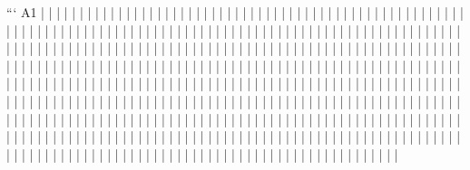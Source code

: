 ```
  A1
   |
   |
   |
   |
   |
   |
   |
   |
   |
   |
   |
   |
   |
   |
   |
   |
   |
   |
   |
   |
   |
   |
   |
   |
   |
   |
   |
   |
   |
   |
   |
   |
   |
   |
   |
   |
   |
   |
   |
   |
   |
   |
   |
   |
   |
   |
   |
   |
   |
   |
   |
   |
   |
   |
   |
   |
   |
   |
   |
   |
   |
   |
   |
   |
   |
   |
   |
   |
   |
   |
   |
   |
   |
   |
   |
   |
   |
   |
   |
   |
   |
   |
   |
   |
   |
   |
   |
   |
   |
   |
   |
   |
   |
   |
   |
   |
   |
   |
   |
   |
   |
   |
   |
   |
   |
   |
   |
   |
   |
   |
   |
   |
   |
   |
   |
   |
   |
   |
   |
   |
   |
   |
   |
   |
   |
   |
   |
   |
   |
   |
   |
   |
   |
   |
   |
   |
   |
   |
   |
   |
   |
   |
   |
   |
   |
   |
   |
   |
   |
   |
   |
   |
   |
   |
   |
   |
   |
   |
   |
   |
   |
   |
   |
   |
   |
   |
   |
   |
   |
   |
   |
   |
   |
   |
   |
   |
   |
   |
   |
   |
   |
   |
   |
   |
   |
   |
   |
   |
   |
   |
   |
   |
   |
   |
   |
   |
   |
   |
   |
   |
   |
   |
   |
   |
   |
   |
   |
   |
   |
   |
   |
   |
   |
   |
   |
   |
   |
   |
   |
   |
   |
   |
   |
   |
   |
   |
   |
   |
   |
   |
   |
   |
   |
   |
   |
   |
   |
   |
   |
   |
   |
   |
   |
   |
   |
   |
   |
   |
   |
   |
   |
   |
   |
   |
   |
   |
   |
   |
   |
   |
   |
   |
   |
   |
   |
   |
   |
   |
   |
   |
   |
   |
   |
   |
   |
   |
   |
   |
   |
   |
   |
   |
   |
   |
   |
   |
   |
   |
   |
   |
   |
   |
   |
   |
   |
   |
   |
   |
   |
   |
   |
   |
   |
   |
   |
   |
   |
   |
   |
   |
   |
   |
   |
   |
   |
   |
   |
   |
   |
   |
   |
   |
   |
   |
   |
   |
   |
   |
   |
   |
   |
   |
   |
   |
   |
   |
   |
   |
   |
   |
   |
   |
   |
   |
   |
   |
   |
   |
   |
   |
   |
   |
   |
   |
   |
   |
   |
   |
   |
   |
   |
   |
   |
   |
   |
   |
   |
   |
   |
   |
   |
   |
   |
   |
   |
   |
   |
   |
   |
   |
   |
   |
   |
   |
   |
   |
   |
   |
   |
   |
   |
   |
   |
   |
   |
   |
   |
   |
   |
   |
   |
   |
   |
   |
   |
   |
   |
   |
   |
   |
   |
   |
   |
   |
   |
   |
   |
   |
   |
   |
   |
   |
   |
   |
   |
   |
   |
   |
   |
   |
   |
   |
   |
   |
   |
   |
   |
   |
   |
   |
   |
   |
   |
   |
   |
   |
   |
   |
   |
   |
   |
   |
   |
   |
   |
   |
   |
   |
   |
   |
   |
   |
   |
   |
   |
   |
   |
   |
   |
   |
   |
   |
   |
   |
   |
   |
   |
   |
   |
   |
   |
   |
   |
   |
   |
   |
   |
   |
   |
   |
   |
   |
   |
   |
   |
   |
   |
   |
   |
   |
   |
   |
   |
   |
   |
   |
   |
   |
   |
   |
   |
   |
   |
   |
   |
   |
   |
   |
   |
